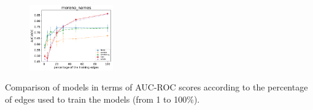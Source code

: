 \begin{subfigure}                                                           
         \centering                                                         
      \includegraphics[width=0.32\textwidth]{fig/moreno_names__entropy@_roc_evo}
\end{subfigure}                                                             
\caption{Comparison of models in terms of AUC-ROC scores according to the percentage of edges used to train the models (from 1 to 100\%).}


